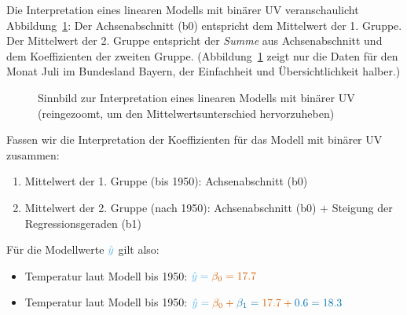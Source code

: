 \documentclass[
  a4paper,
]{scrbook}
\providecommand{\tightlist}{%
  \setlength{\itemsep}{0pt}\setlength{\parskip}{0pt}}\usepackage{longtable,booktabs,array}
\theoremstyle{definition}
\theoremstyle{definition}
\theoremstyle{definition}
\theoremstyle{remark}
\begin{document}
Die Interpretation eines linearen Modells mit binärer UV veranschaulicht
Abbildung~\ref{fig-binvar}: Der Achsenabschnitt (b0) entspricht dem
Mittelwert der 1. Gruppe. Der Mittelwert der 2. Gruppe entspricht der
\emph{Summe} aus Achsenabschnitt und dem Koeffizienten der zweiten
Gruppe. (Abbildung~\ref{fig-binvar} zeigt nur die Daten für den Monat
Juli im Bundesland Bayern, der Einfachheit und Übersichtlichkeit
halber.)

\begin{figure}


\caption{\label{fig-binvar}Sinnbild zur Interpretation eines linearen
Modells mit binärer UV (reingezoomt, um den Mittelwertsunterschied
hervorzuheben)}

\end{figure}%

Fassen wir die Interpretation der Koeffizienten für das Modell mit
binärer UV zusammen:

\begin{enumerate}
\def\labelenumi{\arabic{enumi}.}
\tightlist
\item
  Mittelwert der 1. Gruppe (bis 1950): {Achsenabschnitt (b0)}
\item
  Mittelwert der 2. Gruppe (nach 1950): {Achsenabschnitt (b0)} +
  {Steigung der Regressionsgeraden (b1)}
\end{enumerate}

Für die Modellwerte \(\color{modelcol}{\hat{y}}\) gilt also:

\begin{itemize}
\item
  Temperatur laut Modell bis 1950:
  \(\color{modelcol}{\hat{y}} = \color{beta0col}{\beta_0} = 17.7\)
\item
  Temperatur laut Modell bis 1950:
  \(\color{modelcol}{\hat{y}} = \color{beta0col}{\beta_0} +  \color{beta1col}{\beta_1}= \color{beta0col}{17.7} + \color{beta1col}{0.6} = 18.3\)
\end{itemize}
\end{document}
